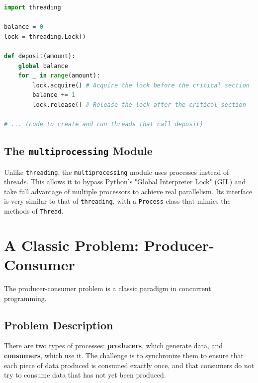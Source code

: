\begin{lstlisting}[language=Python, caption=Using a Lock for mutual exclusion]
import threading

balance = 0
lock = threading.Lock()

def deposit(amount):
    global balance
    for _ in range(amount):
        lock.acquire() # Acquire the lock before the critical section
        balance += 1
        lock.release() # Release the lock after the critical section

# ... (code to create and run threads that call deposit)
\end{lstlisting}

\subsection{The \texttt{multiprocessing} Module}
Unlike \texttt{threading}, the \texttt{multiprocessing} module uses processes instead of threads. This allows it to bypass Python's "Global Interpreter Lock" (GIL) and take full advantage of multiple processors to achieve real parallelism. Its interface is very similar to that of \texttt{threading}, with a \texttt{Process} class that mimics the methods of \texttt{Thread}.

\section{A Classic Problem: Producer-Consumer}
The producer-consumer problem is a classic paradigm in concurrent programming.

\subsection{Problem Description}
There are two types of processes: \textbf{producers}, which generate data, and \textbf{consumers}, which use it. The challenge is to synchronize them to ensure that each piece of data produced is consumed exactly once, and that consumers do not try to consume data that has not yet been produced.

